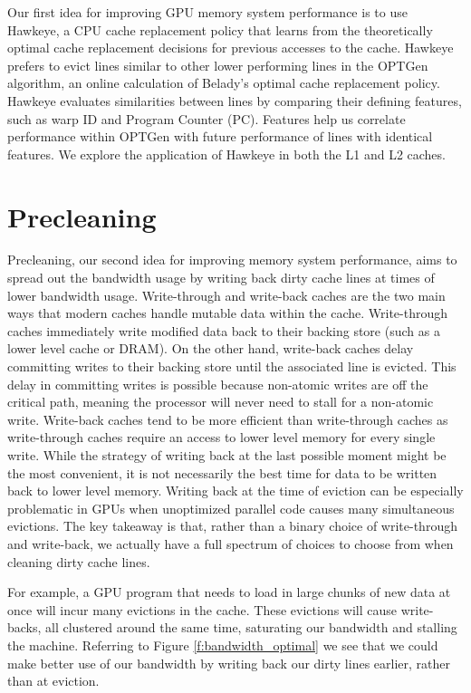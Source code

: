 Our first idea for improving GPU memory system performance is to use Hawkeye, a CPU cache replacement policy that learns from the theoretically optimal cache replacement decisions for previous accesses to the cache. Hawkeye prefers to evict lines similar to other lower performing lines in the OPTGen algorithm, an online calculation of Belady’s optimal cache replacement policy. Hawkeye evaluates similarities between lines by comparing their defining features, such as warp ID and Program Counter (PC). Features help us correlate performance within OPTGen with future performance of lines with identical features. We explore the application of Hawkeye in both the L1 and L2 caches.

\section{Precleaning}
Precleaning, our second idea for improving memory system performance, aims to spread out the bandwidth usage by writing back dirty cache lines at times of lower bandwidth usage. Write-through and write-back caches are the two main ways that modern caches handle mutable data within the cache. Write-through caches immediately write modified data back to their backing store (such as a lower level cache or DRAM). On the other hand, write-back caches delay committing writes to their backing store until the associated line is evicted. This delay in committing writes is possible because non-atomic writes are off the critical path, meaning the processor will never need to stall for a non-atomic write. Write-back caches tend to be more efficient than write-through caches as write-through caches require an access to lower level memory for every single write. While the strategy of writing back at the last possible moment might be the most convenient, it is not necessarily the best time for data to be written back to lower level memory. Writing back at the time of eviction can be especially problematic in GPUs when unoptimized parallel code causes many simultaneous evictions. The key takeaway is that, rather than a binary choice of write-through and write-back, we actually have a full spectrum of choices to choose from when cleaning dirty cache lines.

For example, a GPU program that needs to load in large chunks of new data at once will incur many evictions in the cache. These evictions will cause write-backs, all clustered around the same time, saturating our bandwidth and stalling the machine. Referring to Figure \ref{f:bandwidth_optimal} we see that we could make better use of our bandwidth by writing back our dirty lines earlier, rather than at eviction.


